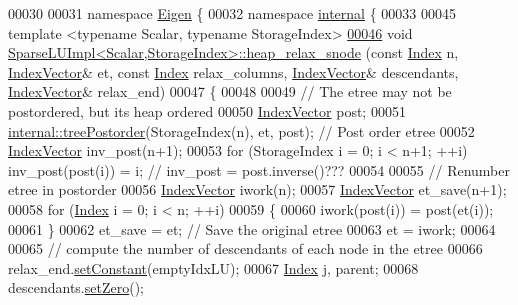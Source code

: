 \begin{DoxyCode}
00030 
00031 \textcolor{keyword}{namespace }\hyperlink{namespace_eigen}{Eigen} \{
00032 \textcolor{keyword}{namespace }\hyperlink{namespaceinternal}{internal} \{
00033 
00045 \textcolor{keyword}{template} <\textcolor{keyword}{typename} Scalar, \textcolor{keyword}{typename} StorageIndex>
\hyperlink{group___sparse_l_u___module_a88952ce33c968374b149e31d0539178d}{00046} \textcolor{keywordtype}{void} \hyperlink{group___sparse_l_u___module_a88952ce33c968374b149e31d0539178d}{SparseLUImpl<Scalar,StorageIndex>::heap\_relax\_snode}
       (\textcolor{keyword}{const} \hyperlink{namespace_eigen_a62e77e0933482dafde8fe197d9a2cfde}{Index} n, \hyperlink{group___core___module_class_eigen_1_1_matrix}{IndexVector}& et, \textcolor{keyword}{const} \hyperlink{namespace_eigen_a62e77e0933482dafde8fe197d9a2cfde}{Index} relax\_columns, 
      \hyperlink{group___core___module_class_eigen_1_1_matrix}{IndexVector}& descendants, \hyperlink{group___core___module_class_eigen_1_1_matrix}{IndexVector}& relax\_end)
00047 \{
00048   
00049   \textcolor{comment}{// The etree may not be postordered, but its heap ordered  }
00050   \hyperlink{group___core___module_class_eigen_1_1_matrix}{IndexVector} post;
00051   \hyperlink{namespace_eigen_1_1internal_ab414b5990bd6c865958a9231ff418d20}{internal::treePostorder}(StorageIndex(n), et, post); \textcolor{comment}{// Post order etree}
00052   \hyperlink{group___core___module_class_eigen_1_1_matrix}{IndexVector} inv\_post(n+1); 
00053   \textcolor{keywordflow}{for} (StorageIndex i = 0; i < n+1; ++i) inv\_post(post(i)) = i; \textcolor{comment}{// inv\_post = post.inverse()???}
00054   
00055   \textcolor{comment}{// Renumber etree in postorder }
00056   \hyperlink{group___core___module_class_eigen_1_1_matrix}{IndexVector} iwork(n);
00057   \hyperlink{group___core___module_class_eigen_1_1_matrix}{IndexVector} et\_save(n+1);
00058   \textcolor{keywordflow}{for} (\hyperlink{namespace_eigen_a62e77e0933482dafde8fe197d9a2cfde}{Index} i = 0; i < n; ++i)
00059   \{
00060     iwork(post(i)) = post(et(i));
00061   \}
00062   et\_save = et; \textcolor{comment}{// Save the original etree}
00063   et = iwork; 
00064   
00065   \textcolor{comment}{// compute the number of descendants of each node in the etree}
00066   relax\_end.\hyperlink{class_eigen_1_1_plain_object_base_ac8dea1df3d92b752cc683ff42abf6f9b}{setConstant}(emptyIdxLU);
00067   \hyperlink{namespace_eigen_a62e77e0933482dafde8fe197d9a2cfde}{Index} j, parent; 
00068   descendants.\hyperlink{class_eigen_1_1_plain_object_base_ac21ad5f989f320e46958b75ac8d9a1da}{setZero}();

\end{DoxyCode}
